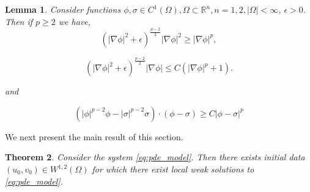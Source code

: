 \documentclass[10pt]{amsart}
\theoremstyle{plain}
\newtheorem{theorem}{Theorem}[section]
\newtheorem{lemma}[theorem]{Lemma}
\theoremstyle{definition}
\begin{document}
\begin{lemma}
\label{lem:pc1}
    Consider functions $\phi, \sigma \in C^{1}(\Omega), \Omega \subset \mathbb{R}^{n}, n=1,2, |\Omega| < \infty$, $\epsilon > 0$. Then if $p \geq 2$ we have,
    \begin{equation}
        (|\nabla \phi|^{2} + \epsilon)^{\frac{p-2}{2}}|\nabla \phi|^{2} \geq |\nabla \phi|^{p},
\end{equation}


\begin{equation}
        (|\nabla \phi|^{2} + \epsilon)^{\frac{p-2}{2}}|\nabla \phi| \leq C\left(|\nabla \phi|^{p}+1\right).
\end{equation}

and 

\begin{equation}
        (|\phi|^{p-2}\phi - |\sigma|^{p-2}\sigma)\cdot (\phi - \sigma) \geq C |\phi - \sigma|^{p}
\end{equation}

\end{lemma}


We next present the main result of this section.



\begin{theorem}
Consider the system \eqref{eq:pde_model}. Then there exists initial data $(u_{0},v_{0}) \in W^{1,2} (\Omega)$ for which there exist local weak solutions to \eqref{eq:pde_model}.
\end{theorem}





\end{document}
